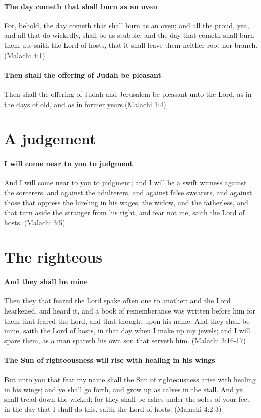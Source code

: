 \paragraph{The day cometh that shall burn as an oven}
For, behold, the day cometh that shall burn as an oven; and all the proud, yea, and all that do wickedly, shall be as stubble: and the day that cometh shall burn them up, saith the Lord of hosts, that it shall leave them neither root nor branch. (Malachi 4:1)

\paragraph{Then shall the offering of Judah be pleasant}
Then shall the offering of Judah and Jerusalem be pleasant unto the Lord, as in the days of old, and as in former years.(Malachi 1:4)

\section{A judgement}

\paragraph{I will come near to you to judgment}
And I will come near to you to judgment; and I will be a swift witness against the sorcerers, and against the adulterers, and against false swearers, and against those that oppress the hireling in his wages, the widow, and the fatherless, and that turn aside the stranger from his right, and fear not me, saith the Lord of hosts. (Malachi 3:5)

\section{The righteous}

\paragraph{And they shall be mine}
Then they that feared the Lord spake often one to another: and the Lord hearkened, and heard it, and a book of rememberance was written before him for them that feared the Lord, and that thought upon his name. And they shall be mine, saith the Lord of hosts, in that day when I make up my jewels; and I will spare them, as a man spareth his own son that serveth him. (Malachi 3:16-17)

\paragraph{The Sun of righteousness will rise with healing in his wings}
But unto you that fear my name shall the Sun of righteousness arise with healing in his wings; and ye shall go forth, and grow up as calves in the stall. And ye shall tread down the wicked; for they shall be ashes under the soles of your feet in the day that I shall do this, saith the Lord of hosts. (Malachi 4:2-3)
